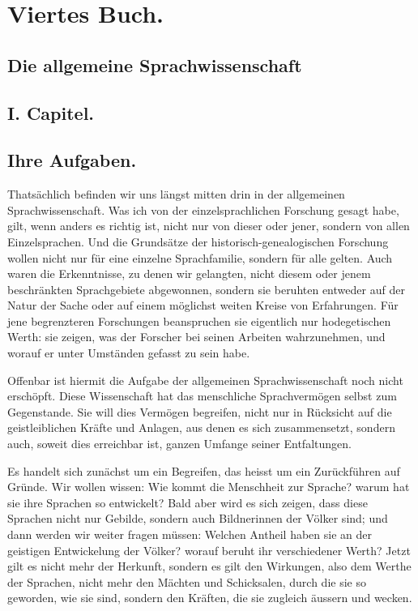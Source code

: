 \cohead{ }
\chapter*{Viertes Buch.}\label{IV}
\section*{Die allgemeine Sprachwissenschaft}
\section*{I. Capitel.}\label{IV.I}
\section*{Ihre Aufgaben.}

\label{fp.292} \label{sp.302}

Thatsächlich befinden wir uns längst mitten drin in der allgemeinen Sprachwissenschaft. Was ich von der einzelsprachlichen Forschung gesagt habe, gilt, wenn anders es richtig ist, nicht nur von dieser oder jener, sondern von allen Einzelsprachen. Und die Grundsätze der historisch-genealogischen Forschung wollen nicht nur für eine einzelne Sprachfamilie, sondern für alle gelten. Auch waren die Erkenntnisse, zu denen wir gelangten, nicht diesem oder jenem beschränkten Sprachgebiete abgewonnen, sondern sie beruhten entweder auf der Natur der Sache oder auf einem möglichst weiten Kreise von Erfahrungen. Für jene begrenzteren Forschungen beanspruchen sie eigentlich nur hodegetischen Werth: sie zeigen, was der Forscher bei seinen Arbeiten wahrzunehmen, und worauf er unter Umständen gefasst zu sein habe.

Offenbar ist hiermit die Aufgabe der allgemeinen Sprachwissenschaft noch nicht erschöpft. Diese Wissenschaft hat das menschliche Sprachvermögen selbst zum Gegenstande. Sie will dies Vermögen begreifen, nicht nur in Rücksicht auf die geistleiblichen Kräfte und Anlagen, aus denen es sich zusammensetzt, sondern auch, soweit dies erreichbar ist,  ganzen Umfange seiner Entfaltungen.

Es handelt sich zunächst um ein Begreifen, das heisst um ein Zurückführen auf Gründe. Wir wollen wissen: Wie kommt die Menschheit zur Sprache? warum hat sie ihre Sprachen so  entwickelt? Bald aber wird es sich zeigen, dass diese Sprachen nicht nur Gebilde, sondern auch Bildnerinnen der Völker sind; und dann werden \label{fp.293} wir weiter fragen müssen: Welchen Antheil haben sie an der geistigen Entwickelung der Völker? worauf beruht ihr verschiedener Werth? Jetzt gilt es nicht mehr der Herkunft, sondern es gilt den Wirkungen, al\-so dem Werthe der Sprachen, nicht mehr den Mächten \label{sp.303} und Schicksalen, durch die sie so geworden, wie sie sind, sondern den Kräften, die sie zugleich äussern und wecken.

